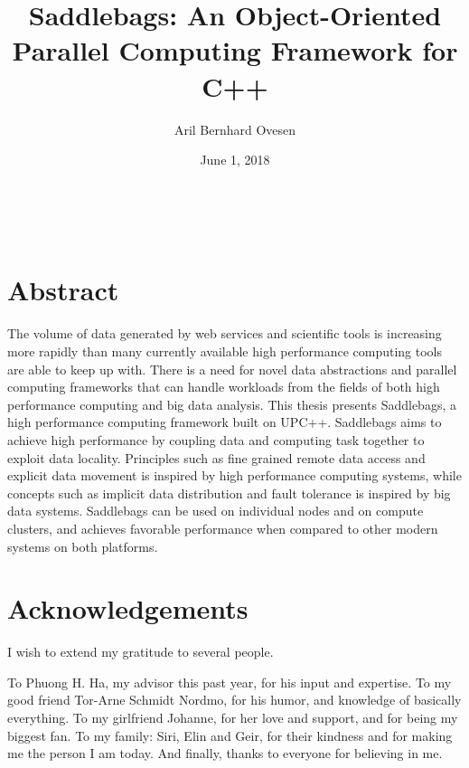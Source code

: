 \documentclass{uit-report}
\begin{document}

\title{Saddlebags: An Object-Oriented Parallel Computing Framework for C++}
\author{Aril Bernhard Ovesen}
\date{June 1, 2018}




\newpage\
\pagestyle{empty}

\mbox{}

\pagebreak
{}
\pagestyle{firststyle}
\section*{Abstract}
The volume of data generated by web services and scientific tools is increasing more rapidly than many currently available high performance computing tools are able to keep up with. There is a need for novel data abstractions and parallel computing frameworks that can handle workloads from the fields of both high performance computing and big data analysis. This thesis presents Saddlebags, a high performance computing framework built on UPC++. Saddlebags aims to achieve high performance by coupling data and computing task together to exploit data locality. Principles such as fine grained remote data access and explicit data movement is inspired by high performance computing systems, while concepts such as implicit data distribution and fault tolerance is inspired by big data systems. Saddlebags can be used on individual nodes and on compute clusters, and achieves favorable performance when compared to other modern systems on both platforms.


\newpage
\section*{Acknowledgements}
I wish to extend my gratitude to several people.

To Phuong H. Ha, my advisor this past year, for his input and expertise. To my good friend Tor-Arne Schmidt Nordmo, for his humor, and knowledge of basically everything. To my girlfriend Johanne, for her love and support, and for being my biggest fan. To my family: Siri, Elin and Geir, for their kindness and for making me the person I am today. And finally, thanks to everyone for believing in me.
\end{document}
